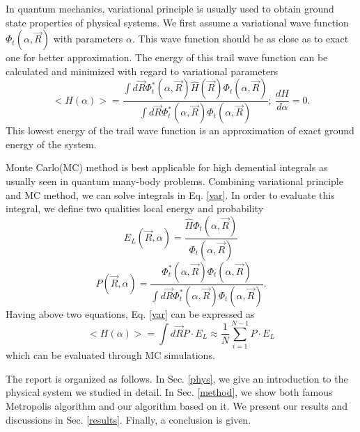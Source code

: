 In quantum mechanics, variational principle is usually used to obtain ground state properties of physical systems.
We first assume a variational wave function $\Phi_t(\alpha,\vec{R})$ with parameters $\alpha$.
This wave function should be as close as to exact one for better approximation.
The energy of this trail wave function can be calculated and minimized with regard to variational parameters
\begin{equation}\label{var}
	<H(\alpha)>=\frac{\int d\vec{R}\Phi_t^\ast(\alpha,\vec{R})\hat{H}(\vec{R})\Phi_t(\alpha,\vec{R})}{\int d\vec{R}\Phi_t^\ast(\alpha,\vec{R})\Phi_t(\alpha,\vec{R})};\ \frac{dH}{d\alpha}=0.
\end{equation}
This lowest energy of the trail wave function is an approximation of exact ground energy of the system.

Monte Carlo(MC) method is best applicable for high demential integrals as usually seen in quantum many-body problems.
Combining variational principle and MC method, we can solve integrals in Eq. \ref{var}.
In order to evaluate this integral, we define two qualities local energy and probability
\begin{equation}\label{local}
		E_L(\vec{R},\alpha)=\frac{\hat{H}\Phi_t(\alpha,\vec{R})}{\Phi_t(\alpha,\vec{R})}
\end{equation}
\begin{equation}\label{local}
		P(\vec{R},\alpha)=\frac{\Phi_t^\ast(\alpha,\vec{R})\Phi_t(\alpha,\vec{R})}{\int d\vec{R}\Phi_t^\ast(\alpha,\vec{R})\Phi_t(\alpha,\vec{R})}.
\end{equation}
Having above two equations, Eq. \ref{var} can be expressed as 
\begin{equation}
	<H(\alpha)>=\int d\vec{R}P\cdot E_L \approx \frac{1}{N}\sum_{i=1}^{N-1}P\cdot E_L
\end{equation}
which can be evaluated through MC simulations.

The report is organized as follows. 
In Sec. \ref{phys}, we give an introduction to the physical system we studied in detail.
In Sec. \ref{method}, we show both famous Metropolis algorithm and our algorithm based on it.
We present our results and discussions in Sec. \ref{results}.
Finally, a conclusion is given.




